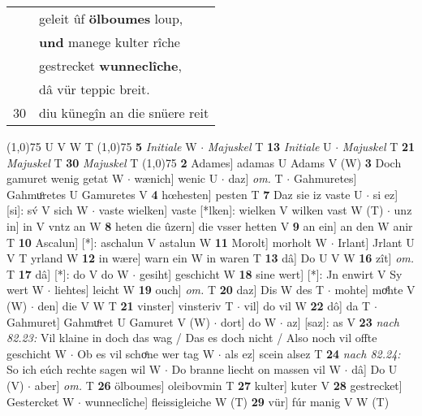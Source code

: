 \documentclass[8pt,a4paper,notitlepage]{article}
\begin{document}
\begin{table}[ht]
\begin{minipage}[t]{0.5\linewidth}
\begin{tabular}{rl}
 & geleit ûf \textbf{ölboumes} loup,\\ 
 & \textbf{und} manege kulter rîche\\ 
 & gestrecket \textbf{wunneclîche},\\ 
 & dâ vür teppic breit.\\ 
30 & diu künegîn an die snüere reit\\ 
\end{tabular}
\scriptsize
\line(1,0){75} \newline
U V W T \newline
\line(1,0){75} \newline
\textbf{5} \textit{Initiale} W   $\cdot$ \textit{Majuskel} T  \textbf{13} \textit{Initiale} U   $\cdot$ \textit{Majuskel} T  \textbf{21} \textit{Majuskel} T  \textbf{30} \textit{Majuskel} T  \newline
\line(1,0){75} \newline
\textbf{2} Adames] adamas U Adams V (W) \textbf{3} Doch gamuret wenig getat W  $\cdot$ wænich] wenic U  $\cdot$ daz] \textit{om.} T  $\cdot$ Gahmuretes] Gahmuͦretes U Gamuretes V \textbf{4} hœhesten] pesten T \textbf{7} Daz sie iz vaste U  $\cdot$ si ez] [si]: sv́ V sich W  $\cdot$ vaste wielken] vaste [*lken]: wielken V wilken vast W (T)  $\cdot$ unz in] in V vntz an W \textbf{8} heten die ûzern] die vsser hetten V \textbf{9} an ein] an den W anir T \textbf{10} Ascalun] [*]: aschalun V astalun W \textbf{11} Morolt] morholt W  $\cdot$ Irlant] Jrlant U V T yrland W \textbf{12} in wære] warn ein W in waren T \textbf{13} dâ] Do U V W \textbf{16} zît] \textit{om.} T \textbf{17} dâ] [*]: do V do W  $\cdot$ gesiht] geschicht W \textbf{18} sine wert] [*]: Jn enwirt V Sy wert W  $\cdot$ liehtes] leicht W \textbf{19} ouch] \textit{om.} T \textbf{20} daz] Dis W des T  $\cdot$ mohte] moͤhte V (W)  $\cdot$ den] die V W T \textbf{21} vinster] vinsteriv T  $\cdot$ vil] do vil W \textbf{22} dô] da T  $\cdot$ Gahmuret] Gahmuͦret U Gamuret V (W)  $\cdot$ dort] do W  $\cdot$ az] [saz]: as V \textbf{23} \textit{nach 82.23:} Vil klaine in doch das wag / Das es doch nicht / Also noch vil offte geschicht W   $\cdot$ Ob es vil schoͤne wer tag W  $\cdot$ als ez] scein alsez T \textbf{24} \textit{nach 82.24:} So ich eúch rechte sagen wil W   $\cdot$ Do branne liecht on massen vil W  $\cdot$ dâ] Do U (V)  $\cdot$ aber] \textit{om.} T \textbf{26} ölboumes] oleibovmin T \textbf{27} kulter] kuter V \textbf{28} gestrecket] Gestercket W  $\cdot$ wunneclîche] fleissigleiche W (T) \textbf{29} vür] fúr manig V W (T) \newline
\end{minipage}
\end{table}
\end{document}
